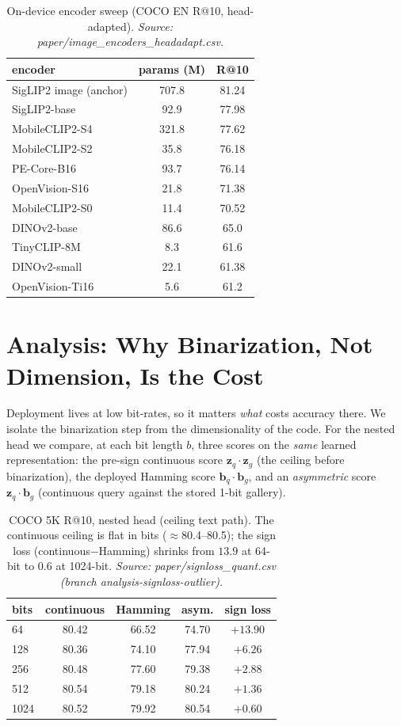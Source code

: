 \documentclass[letterpaper]{article} %
\newcommand{\src}[1]{\footnotesize\textit{Source: #1.}}
\begin{document}
\begin{table}[t]
\centering\small
\begin{tabular}{lcc}
\toprule
encoder & params (M) & R@10 \\
\midrule
SigLIP2 image (anchor) & 707.8 & 81.24 \\
SigLIP2-base           & 92.9  & 77.98 \\
MobileCLIP2-S4         & 321.8 & 77.62 \\
MobileCLIP2-S2         & 35.8  & 76.18 \\
PE-Core-B16            & 93.7  & 76.14 \\
OpenVision-S16         & 21.8  & 71.38 \\
MobileCLIP2-S0         & 11.4  & 70.52 \\
DINOv2-base            & 86.6  & 65.0  \\
TinyCLIP-8M            & 8.3   & 61.6  \\
DINOv2-small           & 22.1  & 61.38 \\
OpenVision-Ti16        & 5.6   & 61.2  \\
\bottomrule
\end{tabular}
\caption{On-device encoder sweep (COCO EN R@10, head-adapted). \src{paper/image\_encoders\_headadapt.csv}}
\label{tab:encoders}
\end{table}

\section{Analysis: Why Binarization, Not Dimension, Is the Cost}
\label{sec:binarization}
Deployment lives at low bit-rates, so it matters \emph{what} costs accuracy there. We isolate the
binarization step from the dimensionality of the code. For the nested head we compare, at each bit
length $b$, three scores on the \emph{same} learned representation: the pre-sign continuous score
$\mathbf{z}_q\!\cdot\!\mathbf{z}_g$ (the ceiling before binarization), the deployed Hamming score
$\mathbf{b}_q\!\cdot\!\mathbf{b}_g$, and an \emph{asymmetric} score
$\mathbf{z}_q\!\cdot\!\mathbf{b}_g$ (continuous query against the stored 1-bit gallery).

\begin{table}[t]
\centering\small
\begin{tabular}{lcccc}
\toprule
bits & continuous & Hamming & asym. & sign loss \\
\midrule
64   & 80.42 & 66.52 & 74.70 & $+13.90$ \\
128  & 80.36 & 74.10 & 77.94 & $+6.26$ \\
256  & 80.48 & 77.60 & 79.38 & $+2.88$ \\
512  & 80.54 & 79.18 & 80.24 & $+1.36$ \\
1024 & 80.52 & 79.92 & 80.54 & $+0.60$ \\
\bottomrule
\end{tabular}
\caption{COCO 5K R@10, nested head (ceiling text path). The continuous ceiling is flat in bits
($\approx$80.4--80.5); the sign loss (continuous$-$Hamming) shrinks from $13.9$ at 64-bit to $0.6$ at
1024-bit. \src{paper/signloss\_quant.csv (branch analysis-signloss-outlier)}}
\label{tab:signloss}
\end{table}
\end{document}
